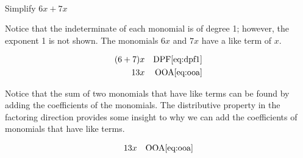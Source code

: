 \begin{example}[id:20141120-203846] \label{20141120-203846} \hfill \\

Simplify $6x+7x$

\soln

\solnsteps

Notice that the indeterminate of each monomial is of degree 1; however, the exponent 1 is not shown.  The monomials $6x$ and $7x$ have a like term of $x$.

\begin{align*}
(6+7)x && \text{DPF} \eqref{eq:dpf1} \\
13x && \text{OOA} \eqref{eq:ooa} 
\end{align*}

Notice that the sum of two monomials that have like terms can be found by adding the coefficients of the monomials.  The distributive property in the factoring direction provides some insight to why we can add the coefficients of monomials that have like terms.\\

\soln

\lesssteps
\begin{align*}
13x && \text{OOA} \eqref{eq:ooa} 
\end{align*}

\end{example}

